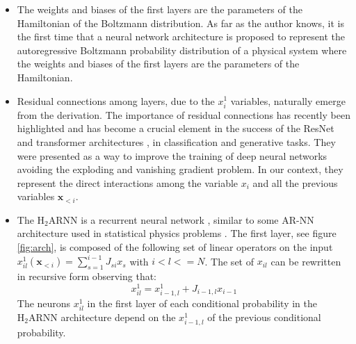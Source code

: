\documentclass[aps,physrev,10pt,floatfix,reprint]{revtex4-2}
\begin{document}
\begin{itemize}
    \item The weights and biases of the first layers are the parameters of the Hamiltonian of the Boltzmann distribution.  As far as the author knows, it is the first time that a neural network architecture is proposed to represent the autoregressive Boltzmann probability distribution of a physical system where the weights and biases of the first layers are the parameters of the Hamiltonian. 
    \item Residual connections among layers, due to the $x_i^1$ variables, naturally emerge from the derivation. 
    The importance of residual connections has recently been highlighted  \cite{10.48550/arxiv.1512.03385} and has become a crucial element in the success of the ResNet and transformer architectures \cite{vaswani2017attention}, in classification and generative tasks. They were presented as a way to improve the training of deep neural networks avoiding the exploding and vanishing gradient problem. In our context, they represent the direct interactions among the variable $x_i$ and all the previous variables $\mathbf{x}_{<i}$. 

    \item The $\text{H}_2\text{ARNN}$ is a recurrent neural network \cite{bengioNatureDeepLearning2015, https://doi.org/10.48550/arxiv.1506.00019}, similar to some AR-NN architecture used in statistical physics problems \cite{10.1038/s42256-021-00401-3, PhysRevResearch.2.023358}. 
    The first layer, see figure \ref{fig:arch}, is composed of the following set of linear operators on the input $x^1_{il}(\mathbf{x}_{<i})=\sum_{s=1}^{i-1} J_{si} x_s$ with $i<l<=N$. The set of $x_{il}$ can be rewritten in recursive form observing that:
    \begin{equation}
        x^1_{il} = x^1_{i-1,l} + J_{i-1,l} x_{i-1}
    \end{equation}
    The neurons $x^1_{il}$ in the first layer of each conditional probability in the $\text{H}_2\text{ARNN}$ architecture depend on the $x^1_{i-1,l}$ of the previous conditional probability.
\end{itemize}
\end{document}
